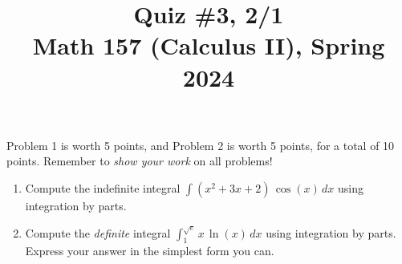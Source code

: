 \documentclass[11pt]{article}
\title{Quiz \#3, 2/1 \\ Math 157 (Calculus II), Spring 2024}
\date{}
\begin{document}
\maketitle

\thispagestyle{empty}

\vspace{-2cm}

Problem 1 is worth 5 points, and Problem 2 is worth 5 points, for a total of 10 points. Remember to \emph{show your work} on all problems!

\begin{enumerate}
\item Compute the indefinite integral $\displaystyle \int (x^2+3x+2) \, \cos(x) \, dx$ using integration by parts.

\vspace{8cm}

\item Compute the \emph{definite} integral $\displaystyle \int_{1}^{\sqrt{e}} x \, \ln(x) \, dx$ using integration by parts. Express your answer in the simplest form you can.

\end{enumerate}
\end{document}
